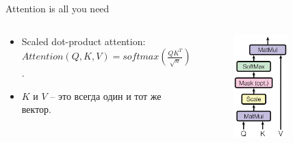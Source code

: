 \begin{frame}[c]{Attention is all you need}
\begin{columns}[c]
	\begin{column}{0.6\textwidth}
		\begin{itemize}
			\item Scaled dot-product attention: $Attention(Q,K,V)=softmax(\frac{QK^T}{\sqrt{n}})V$.
			\item $K$ и $V$ -- это всегда один и тот же вектор.
		\end{itemize}
	\end{column}
	\begin{column}{0.4\textwidth}
		\begin{figure}
			\centering
			\includegraphics[width=0.6\textwidth]{figures/scaleddotattention.png}
		\end{figure}
	\end{column}
\end{columns}
\end{frame}

